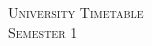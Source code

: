 \documentclass[10pt]{article} %
\begin{document}
\pagestyle{empty} %

\setlength{\parindent}{0pt} %



\begin{center}
	\textsc{\LARGE University Timetable}\\ %
	\textsc{\large Semester 1} %
\end{center}

\end{document}

